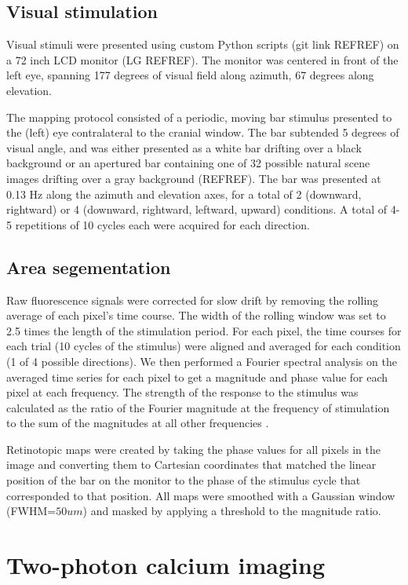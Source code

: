 \subsection{Visual stimulation}
Visual stimuli were presented using custom Python scripts (git link REFREF) on a 72 inch LCD monitor (LG REFREF). The monitor was centered in front of the left eye, spanning 177 degrees of visual field along azimuth, 67 degrees along elevation.

The mapping protocol consisted of a periodic, moving bar stimulus \cite{Kalatsky2003, Marshel2011} presented to the (left) eye contralateral to the cranial window. The bar subtended 5 degrees of visual angle, and was either presented as a white bar drifting over a black background or an apertured bar containing one of 32 possible natural scene images drifting over a gray background (REFREF). The bar was presented at 0.13 Hz along the azimuth and elevation axes, for a total of 2 (downward, rightward) or 4 (downward, rightward, leftward, upward) conditions. A total of 4-5 repetitions of 10 cycles each were acquired for each direction. 

\subsection{Area segementation}
Raw fluorescence signals were corrected for slow drift by removing the rolling average of each pixel’s time course. The width of the rolling window was set to 2.5 times the length of the stimulation period. For each pixel, the time courses for each trial (10 cycles of the stimulus) were aligned and averaged for each condition (1 of 4 possible directions). We then performed a Fourier spectral analysis on the averaged time series for each pixel to get a magnitude and phase value for each pixel at each frequency. The strength of the response to the stimulus was calculated as the ratio of the Fourier magnitude at the frequency of stimulation to the sum of the magnitudes at all other frequencies \cite{Kalatsky2003, OTHERS}.

Retinotopic maps were created by taking the phase values for all pixels in the image and converting them to Cartesian coordinates that matched the linear position of the bar on the monitor to the phase of the stimulus cycle that corresponded to that position. All maps were smoothed with a Gaussian window (FWHM=$50um$) and masked by applying a threshold to the magnitude ratio.  

\section{Two-photon calcium imaging}

